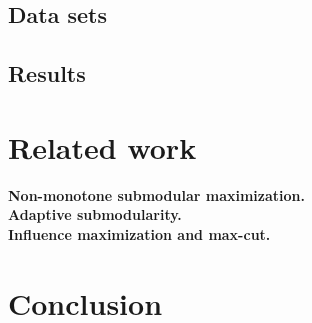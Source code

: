 \documentclass{article}
\renewcommand{\paragraph}[1]{\vspace{0.3em}\noindent\textbf{#1.}\makebox[0.5em]{}}
\begin{document}
\subsection{Data sets}

\subsection{Results}

\section{Related work}
\paragraph{Non-monotone submodular maximization}\\
\paragraph{Adaptive submodularity}\\
\paragraph{Influence maximization and max-cut}

\section{Conclusion}

\clearpage



\iftoggle{short}
{}
{
\clearpage
\onecolumn
\appendix
\setcounter{lemma}{0}
\setcounter{theorem}{0}

}
\end{document}

